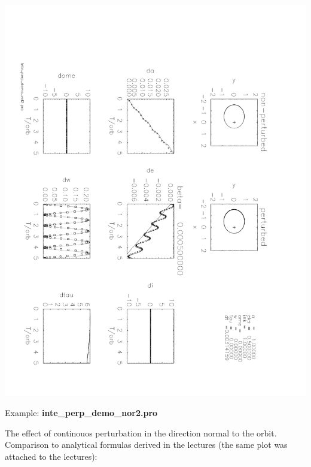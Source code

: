 \documentclass[a4paper,12pt]{article}
\def\red{\color{red}}
\def\black{\color{RGBblack}}
\begin{document}
{{\hspace{-3cm} \includegraphics[angle=90,width=0.8\paperwidth]{inte_perp_demo_vel2.pdf}


\newpage
\black

Example: {\bf inte\_perp\_demo\_nor2.pro}

\bul The effect of continouos perturbation in the direction normal to
the orbit. Comparison to analytical formulas derived in the lectures
(the same plot was attached to the lectures):

{\scriptsize \red

}\black

}}
\end{document}
